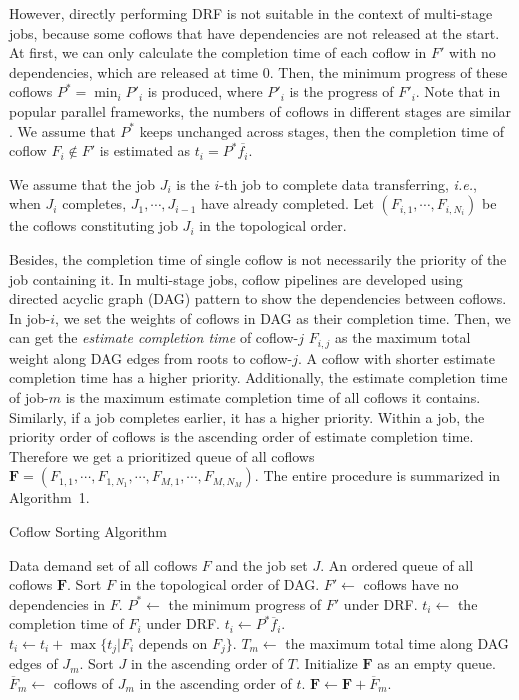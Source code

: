 \documentclass[10pt,journal,compsoc]{IEEEtran}
\begin{document}
However, directly performing DRF is not suitable in the context of multi-stage jobs, because some coflows that have dependencies are not released at the start.
%
At first, we can only calculate the completion time of each coflow in $F'$ with no dependencies, which are released at time 0.
%
Then, the minimum progress of these coflows $P^* = \min_iP'_i$ is produced, where $P'_i$ is the progress of $F'_i$.
%
Note that in popular parallel frameworks, the numbers of coflows in different stages are similar \cite{Spark,coflowsurvey}.
%
We assume that $P^*$ keeps unchanged across stages, then the completion time of coflow $F_i \notin F'$ is estimated as $t_i = P^*\overline{f_i}$.

We assume that the job $J_i$ is the $i$-th job to complete data transferring, \emph{i.e.}, when $J_i$ completes, $J_1,\cdots,J_{i-1}$ have already completed.
%
Let $(F_{i,1},\cdots,F_{i,N_i})$ be the coflows constituting job $J_i$ in the topological order.

Besides, the completion time of single coflow is not necessarily the priority of the job containing it.
%
In multi-stage jobs, coflow pipelines are developed using directed acyclic graph (DAG) pattern to show the dependencies between coflows.
%
In job-$i$, we set the weights of coflows in DAG as their completion time.
%
Then, we can get the \emph{estimate completion time} of coflow-$j$ $F_{i,j}$ as the maximum total weight along DAG edges from roots to coflow-$j$.
%
A coflow with shorter estimate completion time has a higher priority.
%
Additionally, the estimate completion time of job-$m$ is the maximum estimate completion time of all coflows it contains.
%
Similarly, if a job completes earlier, it has a higher priority.
%
Within a job, the priority order of coflows is the ascending order of estimate completion time.
%
Therefore we get a prioritized queue of all coflows $\mathbf{F} = (F_{1,1},\cdots,F_{1,N_1},\cdots,F_{M,1},\cdots,F_{M,N_M})$.
%
The entire procedure is summarized in Algorithm~1.

\begin{algorithm}
	\caption{Coflow Sorting Algorithm}
	\begin{algorithmic}[1]
		\Require Data demand set of all coflows $F$ and the job set $J$.
		\Ensure An ordered queue of all coflows $\mathbf{F}$.
		\State Sort $F$ in the topological order of DAG.
		\State $F' \gets $ coflows have no dependencies in $F$.
		\State $P^* \gets$ the minimum progress of $F'$ under DRF.
				\State $t_i \gets$ the completion time of $F_i$ under DRF.
			\Else
				\State $t_i \gets P^*\overline{f}_i$.
			\EndIf
				\State $t_i \gets t_i + \max{\{t_j|F_i \text{ depends on } F_j\}}$.
			\EndIf
		\EndFor
		\State $T_m \gets$ the maximum total time along DAG edges of $J_m$.
		\State Sort $J$ in the ascending order of $T$.
		\State Initialize $\mathbf{F}$ as an empty queue.
			\State $\overline{F}_m \gets$ coflows of $J_m$ in the ascending order of $t$.
			\State $\mathbf{F} \gets \mathbf{F} + \overline{F}_m$.
		\EndFor
	\end{algorithmic}
\end{algorithm}
\end{document}
